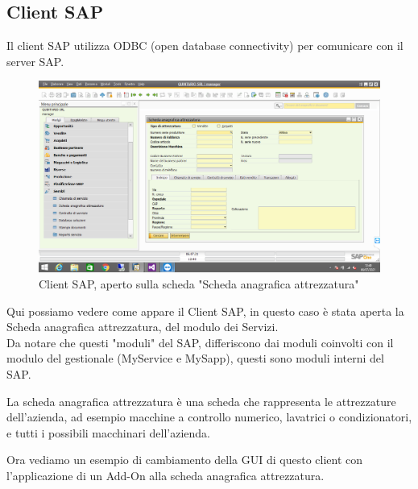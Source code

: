 \pagebreak 

\subsection{Client SAP}
\begin{flushleft}
	\item Il client SAP utilizza ODBC (open database connectivity) per comunicare con il server SAP.
\end{flushleft}
\begin{figure}[!h] 
	\centering 
	\includegraphics[scale = 0.4]{immagini/client-sap.png} 
	\caption {Client SAP, aperto sulla scheda "Scheda anagrafica attrezzatura"}
\end{figure}
\begin{flushleft}
	\item Qui possiamo vedere come appare il Client SAP, in questo caso è stata aperta la Scheda anagrafica attrezzatura, del modulo dei Servizi.\\Da notare che questi "moduli" del SAP, differiscono dai moduli coinvolti con il modulo del gestionale (MyService e MySapp), questi sono moduli interni del SAP.
	\item La scheda anagrafica attrezzatura è una scheda che rappresenta le attrezzature dell'azienda, ad esempio macchine a controllo numerico, lavatrici o condizionatori, e tutti i possibili macchinari dell'azienda.
	\item Ora vediamo un esempio di cambiamento della GUI di questo client con l'applicazione di un Add-On alla scheda anagrafica attrezzatura.
\end{flushleft}
\pagebreak
